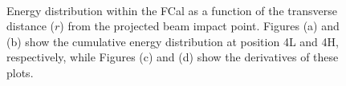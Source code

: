 \begin{figure}[!htb]
\begin{center}

 \\
\caption[Hadronic shower profiles, radial]{Energy distribution within the FCal as a function of the transverse distance ($r$) from the projected beam impact point. Figures (a) and (b) show the cumulative energy distribution at position 4L and 4H, respectively, while Figures (c) and (d) show the derivatives of these plots. }
\label{TBplot_radial_profiles}
\end{center}
\end{figure}

